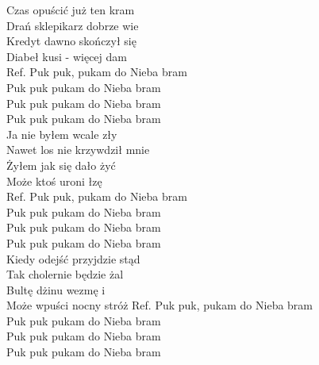 
\begin{flushleft}
Czas opuścić już ten kram \\
Drań sklepikarz dobrze wie \\
Kredyt dawno skończył się \\
Diabeł kusi - więcej dam \\
\vskip 3mm
Ref. Puk puk, pukam do Nieba bram\\
\hspace{0.9cm}Puk puk pukam do Nieba bram\\
\hspace{0.9cm}Puk puk pukam do Nieba bram\\
\hspace{0.9cm}Puk puk pukam do Nieba bram\\
\vskip 3mm
Ja nie byłem wcale zły\\
Nawet los nie krzywdził mnie\\
Żyłem jak się dało żyć\\
Może ktoś uroni łzę\\
\vskip 3mm
Ref. Puk puk, pukam do Nieba bram\\
\hspace{0.9cm}Puk puk pukam do Nieba bram\\
\hspace{0.9cm}Puk puk pukam do Nieba bram\\
\hspace{0.9cm}Puk puk pukam do Nieba bram\\
\vskip 3mm
Kiedy odejść przyjdzie stąd\\
Tak cholernie będzie żal\\
Bultę dżinu wezmę i\\
Może wpuści nocny stróż
\vskip 3mm
Ref. Puk puk, pukam do Nieba bram\\
\hspace{0.9cm}Puk puk pukam do Nieba bram\\
\hspace{0.9cm}Puk puk pukam do Nieba bram\\
\hspace{0.9cm}Puk puk pukam do Nieba bram\\

\end{flushleft}
\newpage